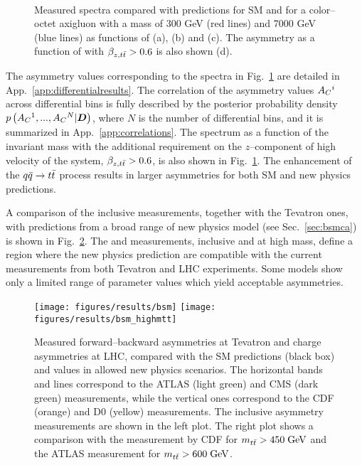 \begin{figure}[!htb]\centering
   \quad
   \\
   \quad
  \caption{Measured \ac{} spectra compared with predictions for SM and
    for a color--octet axigluon with a mass of 300 GeV (red lines) and
    7000 GeV (blue lines) 
    as functions of \mtt{} (a), \pttt{} (b) and \ytt{} (c). The
    asymmetry as a function of \mtt{} with $\beta_{z,t\bar{t}}{}>0.6$ is also
    shown (d).}
  \label{fig:unfac_diff}
\end{figure}

The asymmetry values corresponding to the spectra in
Fig.~\ref{fig:unfac_diff} are detailed in App.~\ref{app:differentialresults}.
The correlation of the asymmetry values $A_C{}^i$ across differential bins is
fully described by the posterior probability density
$p\left(A_C{}^1,...,A_C{}^N|\boldsymbol{D}{}\right)$, where
$N$ is the number of differential bins, and it is summarized in
App.~\ref{app:correlations}.
The \ac{} spectrum as a function of the \ttbar{} invariant mass \mtt{}
with the additional requirement on the $z$--component of high velocity
of the \ttbar{} system, $\beta_{z,t\bar{t}}{}>0.6$, is also shown in
Fig.~\ref{fig:unfac_diff}. The enhancement of the $q\bar{q}{}\to t\bar{t}{}$
process results in larger asymmetries for both SM and new physics
predictions.

A comparison of the inclusive \ac{} measurements, together with the Tevatron
\afb{} ones, with predictions from a broad range of new physics model
(see Sec.~\ref{sec:bsmca}) is shown in Fig.~\ref{fig:summarybsm}. The
\ac{} and \afb{} measurements, inclusive and at high \mtt{} mass,
define a region where the new physics prediction are compatible with
the current measurements from both Tevatron and LHC experiments.
Some models show only a limited range of parameter values which yield
acceptable asymmetries.

\begin{figure}[!htb]
  \centering
  \texttt{[image: figures/results/bsm]}
  \texttt{[image: figures/results/bsm\_highmtt]}
  \caption{Measured forward--backward asymmetries \afb{} at Tevatron
    and charge asymmetries \ac{} at LHC, compared with the SM
    predictions (black box) and values in allowed new physics
    scenarios. The horizontal bands and lines correspond to the ATLAS
    (light green) and CMS (dark green) measurements, while the
    vertical ones correspond to the CDF (orange) and D0 (yellow)
    measurements. The inclusive asymmetry measurements are shown in
    the left plot. The right plot shows a comparison with the \afb{}
    measurement by CDF for $m_{t\bar{t}}{} > 450 \; \mathrm{GeV}{}$ and the ATLAS \ac{}
    measurement for $m_{t\bar{t}}{} > 600 \; \mathrm{GeV}{}$.}
  \label{fig:summarybsm}
\end{figure}


